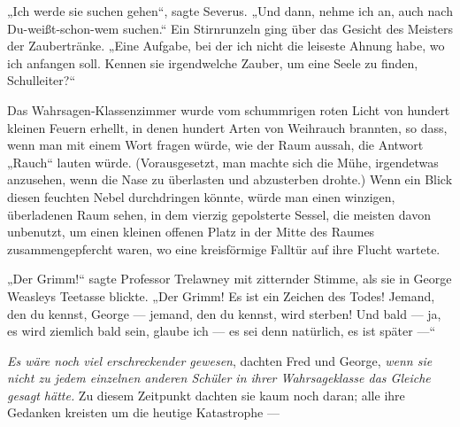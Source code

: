 „Ich werde sie suchen gehen“, sagte Severus.
„Und dann, nehme ich an, auch nach Du-weißt-schon-wem suchen.“ Ein Stirnrunzeln ging über das Gesicht des Meisters der Zaubertränke.
„Eine Aufgabe, bei der ich nicht die leiseste Ahnung habe, wo ich anfangen soll. Kennen sie irgendwelche Zauber, um eine Seele zu finden, Schulleiter?“

\later

Das Wahrsagen-Klassenzimmer wurde vom schummrigen roten Licht von hundert kleinen Feuern erhellt, in denen hundert Arten von Weihrauch brannten, so dass, wenn man mit einem Wort fragen würde, wie der Raum aussah, die Antwort
„Rauch“ lauten würde. (Vorausgesetzt, man machte sich die Mühe, irgendetwas anzusehen, wenn die Nase zu überlasten und abzusterben drohte.) Wenn ein Blick diesen feuchten Nebel durchdringen könnte, würde man einen winzigen, überladenen Raum sehen, in dem vierzig gepolsterte Sessel, die meisten davon unbenutzt, um einen kleinen offenen Platz in der Mitte des Raumes zusammengepfercht waren, wo eine kreisförmige Falltür auf ihre Flucht wartete.

„Der Grimm!“ sagte Professor Trelawney mit zitternder Stimme, als sie in George Weasleys Teetasse blickte.
„Der Grimm! Es ist ein Zeichen des Todes! Jemand, den du kennst, George — jemand, den du kennst, wird sterben! Und bald — ja, es wird ziemlich bald sein, glaube ich — es sei denn natürlich, es ist später —“

\emph{Es wäre noch viel erschreckender gewesen}, dachten Fred und George, \emph{wenn sie nicht zu jedem einzelnen anderen Schüler in ihrer Wahrsageklasse das Gleiche gesagt hätte.}
Zu diesem Zeitpunkt dachten sie kaum noch daran; alle ihre Gedanken kreisten um die heutige Katastrophe —

